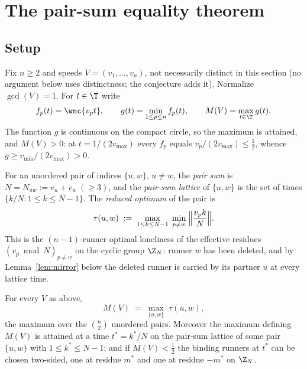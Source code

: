 
\section{The pair-sum equality theorem}\label{sec:equality}

\subsection{Setup}

Fix $n\ge 2$ and speeds $V=(v_1,\dots,v_n)$, not necessarily distinct in
this section (no argument below uses distinctness; the conjecture adds it).
Normalize $\gcd(V)=1$. For $t\in\T$ write
\[
f_p(t)=\wnc{v_p t},\qquad
g(t)=\min_{1\le p\le n} f_p(t),\qquad
M(V)=\max_{t\in\T} g(t).
\]
The function $g$ is continuous on the compact circle, so the maximum is
attained, and $M(V)>0$: at $t=1/(2v_{\max})$ every $f_p$ equals
$v_p/(2v_{\max})\le \tfrac12$, whence $g\ge v_{\min}/(2v_{\max})>0$.

\begin{definition}\label{def:pair}
For an unordered pair of indices $\{u,w\}$, $u\ne w$, the \emph{pair sum}
is $N=N_{uw}:=v_u+v_w\ (\ge 3)$, and the \emph{pair-sum lattice} of
$\{u,w\}$ is the set of times $\{k/N : 1\le k\le N-1\}$. The
\emph{reduced optimum} of the pair is
\[
\tau(u,w)\;:=\;\max_{1\le k\le N-1}\;
\min_{p\ne w}\;\Bigl\lVert \frac{v_p k}{N}\Bigr\rVert .
\]
This is the $(n{-}1)$-runner optimal loneliness of the effective residues
$(v_p\bmod N)_{p\ne w}$ on the cyclic group $\Z_N$: runner $w$ has been
deleted, and by Lemma~\ref{lem:mirror} below the deleted runner is carried
by its partner $u$ at every lattice time.
\end{definition}

\begin{theorem}\label{thm:equality}
For every $V$ as above,
\[
M(V)\;=\;\max_{\{u,w\}}\;\tau(u,w),
\]
the maximum over the $\binom{n}{2}$ unordered pairs. Moreover the maximum
defining $M(V)$ is attained at a time $t^\ast=k^\ast/N$ on the pair-sum
lattice of some pair $\{u,w\}$ with $1\le k^\ast\le N-1$; and if
$M(V)<\tfrac12$ the binding runners at $t^\ast$ can be chosen two-sided,
one at residue $m^\ast$ and one at residue $-m^\ast$ on $\Z_N$.
\end{theorem}

